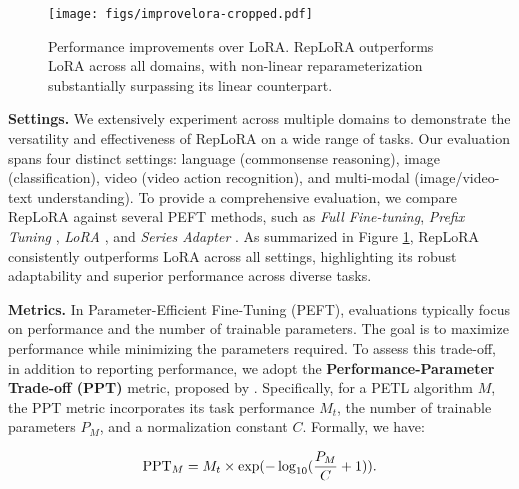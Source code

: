 \begin{figure}
    \centering
    \texttt{[image: figs/improvelora-cropped.pdf]}
    \caption{Performance improvements over LoRA. RepLoRA outperforms LoRA across all domains, with non-linear reparameterization substantially surpassing its linear counterpart.}
    \label{fig: imrpove lora}
    \vspace*{-\baselineskip}
\end{figure}



\vspace{0.5 em}
\noindent
\textbf{Settings. } We extensively experiment across multiple domains to demonstrate the versatility and effectiveness of RepLoRA on a wide range of tasks. Our evaluation spans four distinct settings: language (commonsense reasoning), image (classification), video (video action recognition), and multi-modal (image/video-text understanding). To provide a comprehensive evaluation, we compare RepLoRA against several PEFT methods, such as \textit{Full Fine-tuning}, \textit{Prefix Tuning} \cite{prefix}, \textit{LoRA} \cite{lora}, and \textit{Series Adapter} \cite{houlsby2019parameter}. As summarized in Figure \ref{fig: imrpove lora}, RepLoRA consistently outperforms LoRA across all settings, highlighting its robust adaptability and superior performance across diverse tasks.


\vspace{0.5 em}
\noindent
\textbf{Metrics. } In Parameter-Efficient Fine-Tuning (PEFT), evaluations typically focus on performance and the number of trainable parameters. The goal is to maximize performance while minimizing the parameters required. To assess this trade-off, in addition to reporting performance, we adopt the \textbf{Performance-Parameter Trade-off (PPT)} metric, proposed by \cite{vpetl}. Specifically, for a PETL algorithm $M$, the PPT metric incorporates its task performance $M_t$, the number of trainable parameters $P_M$, and a normalization constant $C$. Formally, we have:

\begin{equation*}
    \mathrm{PPT}_M = M_t \times \exp(-\log_{10}(\frac{P_M}{C}+1)).
    \vspace{-2mm}
\end{equation*}


